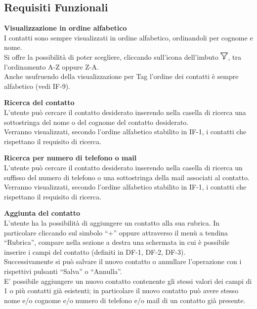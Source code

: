 \subsection{Requisiti Funzionali}
	\begin{tcolorbox}[breakable, colback=white,colframe=black!80!white,title=\textbf{Funzionalità individuali IF}]
	\begin{itemize}[itemsep=2pt, topsep=0pt]
		\hypertarget{IF-1}{\item[\textbf{IF-1}]}
		\textbf{Visualizzazione in ordine alfabetico}
		\\I contatti sono sempre visualizzati in ordine alfabetico, ordinandoli per cognome e nome.
		\\Si offre la possibilità di poter scegliere, cliccando sull’icona dell’imbuto \includegraphics[height=0.4cm]{images/imbuto_icona.jpeg}, tra l’ordinamento A-Z oppure Z-A.
		\\Anche usufruendo della visualizzazione per Tag l’ordine dei contatti è sempre alfabetico (vedi IF-9).
		
		\item[\textbf{IF-2}] \textbf{Ricerca del contatto}
		\\L’utente può cercare il contatto desiderato inserendo nella casella di ricerca una sottostringa del nome o del cognome del contatto desiderato.
		\\Verranno visualizzati, secondo l’ordine alfabetico stabilito in IF-1, i contatti che rispettano il requisito di ricerca.
		
		\item[\textbf{IF-3}] \textbf{Ricerca per numero di telefono o mail}
		\\L’utente può cercare il contatto desiderato inserendo nella casella di ricerca un suffisso del numero di telefono o una sottostringa della mail associati al contatto. 
		\\Verranno visualizzati, secondo l’ordine alfabetico stabilito in IF-1, i contatti che rispettano il requisito di ricerca.		
		
		\item[\textbf{IF-4}] \textbf{Aggiunta del contatto}
		\\L’utente ha la possibilità di aggiungere un contatto alla sua rubrica.
		In particolare cliccando sul simbolo “+” oppure attraverso il menù a tendina “Rubrica”, compare nella sezione a destra una
		schermata in cui è possibile inserire i campi del contatto (definiti in 
		DF-1, DF-2, DF-3).
		\\Successivamente si può salvare il nuovo contatto o annullare  
		l’operazione con i rispettivi pulsanti “Salva” o “Annulla”.
		\\E’ possibile aggiungere un nuovo contatto contenente gli stessi valori dei campi di 1 o più contatti già esistenti; in particolare il nuovo contatto può avere stesso nome e/o cognome e/o numero di telefono e/o mail di un contatto già presente.		
		

\end{itemize}
\end{tcolorbox}
